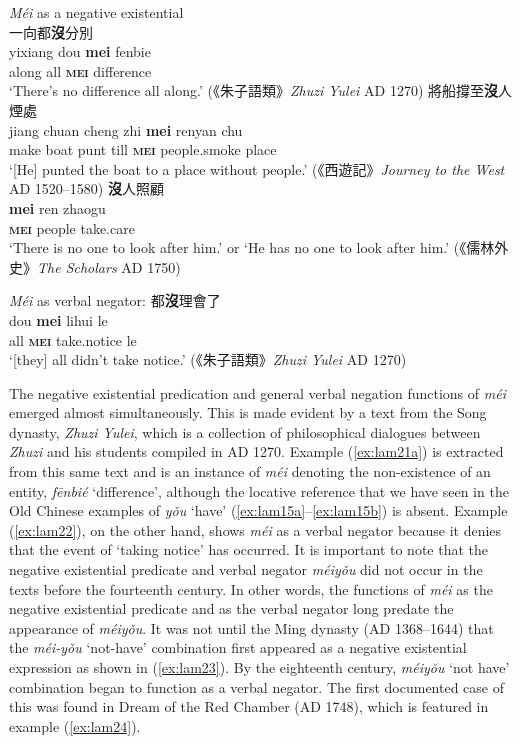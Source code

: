 \documentclass[output=paper]{langscibook}
\begin{document}
\ea \textit{Méi} as a negative existential \label{ex:lam21}\\
  \ea 一向都\textbf{沒}分別 \label{ex:lam21a}\\
  	\gll yixiang dou \textbf{mei} fenbie\\
  	along all \textbf{\textsc{mei}} difference\\
  	\glt `There's no difference all along.' (《朱子語類》\emph{Zhuzi Yulei} AD 1270) 
  \ex 將船撐至\textbf{沒}人煙處 \label{ex:lam21b}\\
  	\gll jiang chuan cheng zhi \textbf{mei} renyan chu\\
  	make boat punt till \textbf{\textsc{mei}} people.smoke place\\
  	\glt `[He] punted the boat to a place without people.' (《西遊記》\emph{Journey to the West} AD 1520–1580)
  \ex \textbf{沒}人照顧 \label{ex:lam21c}\\
	\gll \textbf{mei} ren zhaogu\\
	\textbf{\textsc{mei}}	people	take.care\\
	\glt `There is no one to look after him.' or `He has no one to look after him.' (《儒林外史》\emph{The Scholars} AD 1750)
\z \z

\ea \textit{Méi} as verbal negator: 都\textbf{沒}理會了 \label{ex:lam22}\\
  \gll dou \textbf{mei} lihui le\\
  all \textbf{\textsc{mei}} take.notice le\\
  \glt `[they] all didn't take notice.' (《朱子語類》\emph{Zhuzi Yulei} AD 1270)
\z

The negative existential predication and general verbal negation functions of \textit{méi} emerged almost simultaneously. This is made evident by a text from the Song dynasty, \emph{Zhuzi Yulei}, which is a collection of philosophical dialogues between \emph{Zhuzi} and his students compiled in AD 1270. Example (\ref{ex:lam21a}) is extracted from this same text and is an instance of \textit{méi} denoting the non-existence of an entity, \textit{fēnbié} `difference', although the locative reference that we have seen in the Old Chinese examples of \textit{yǒu} `have' (\ref{ex:lam15a}–\ref{ex:lam15b}) is absent. Example (\ref{ex:lam22}), on the other hand, shows \textit{méi} as a verbal negator because it denies that the event of `taking notice' has occurred. It is important to note that the negative existential predicate and verbal negator \textit{méiyǒu} did not occur in the texts before the fourteenth century. In other words, the functions of \textit{méi} as the negative existential predicate and as the verbal negator long predate the appearance of \textit{méiyǒu}. It was not until the Ming dynasty (AD 1368–1644) that the \textit{méi-yǒu} `not-have' combination first appeared as a negative existential expression as shown in (\ref{ex:lam23}). By the eighteenth century, \textit{méiyŏu} `not have' combination began to function as a verbal negator. The first documented case of this was found in Dream of the Red Chamber (AD 1748), which is featured in example (\ref{ex:lam24}). 
\end{document}

